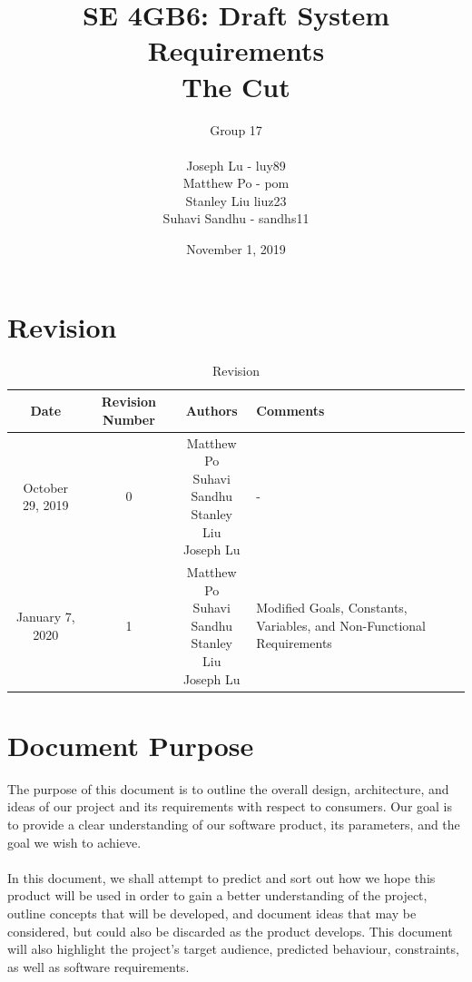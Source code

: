 \documentclass[titlepage]{article}
\title{SE 4GB6: Draft System Requirements\\The Cut}
\author{Group 17\\\\
            Joseph Lu - luy89 \\
            Matthew Po - pom \\
            Stanley Liu  liuz23 \\
            Suhavi Sandhu - sandhs11
            }
\date{November 1, 2019}
\begin{document}
\maketitle
\tableofcontents

\newpage
\section{Revision}

\begin{table}[H]
    \centering

    \begin{tabularx}{\textwidth}{|c|c|c|X|}
        \hline
        Date & Revision Number & Authors & Comments \\ 
        \hline
        October 29, 2019 & 0 & \makecell{Matthew Po\\Suhavi Sandhu\\Stanley Liu\\Joseph Lu} & -\\ 
        \hline
        January 7, 2020 & 1 & \makecell{Matthew Po\\Suhavi Sandhu\\Stanley Liu\\Joseph Lu} & Modified Goals, Constants, Variables, and Non-Functional Requirements\\ 
        \hline
    \end{tabularx}
    \caption{Revision}
    \label{tab:Revision}
\end{table}

\newpage
\section{Document Purpose}
The purpose of this document is to outline the overall design, architecture, and ideas of our project and its requirements with respect to consumers. Our goal is to provide a clear understanding of our software product, its parameters, and the goal we wish to achieve.\\\\
In this document, we shall attempt to predict and sort out how we hope this product will be used in order to gain a better understanding of the project, outline concepts that will be developed, and document ideas that may be considered, but could also be discarded as the product develops. This document will also highlight the project’s target audience, predicted behaviour, constraints, as well as software requirements. 
\end{document}
